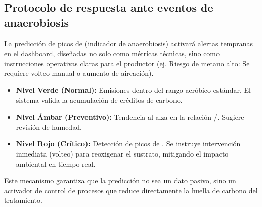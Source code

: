 \subsection{Protocolo de respuesta ante eventos de anaerobiosis}
La predicción de picos de  (indicador de anaerobiosis) activará alertas tempranas en el dashboard, diseñadas no solo como métricas técnicas, sino como instrucciones operativas claras para el productor (ej. Riesgo de metano alto: Se requiere volteo manual o aumento de aireación).
\begin{itemize}
    \item \textbf{Nivel Verde (Normal):} Emisiones dentro del rango aeróbico estándar. El sistema valida la acumulación de créditos de carbono.
    \item \textbf{Nivel Ámbar (Preventivo):} Tendencia al alza en la relación /. Sugiere revisión de humedad.
    \item \textbf{Nivel Rojo (Crítico):} Detección de picos de . Se instruye intervención inmediata (volteo) para reoxigenar el sustrato, mitigando el impacto ambiental en tiempo real.
\end{itemize}

Este mecanismo garantiza que la predicción no sea un dato pasivo, sino un activador de control de procesos que reduce directamente la huella de carbono del tratamiento.
